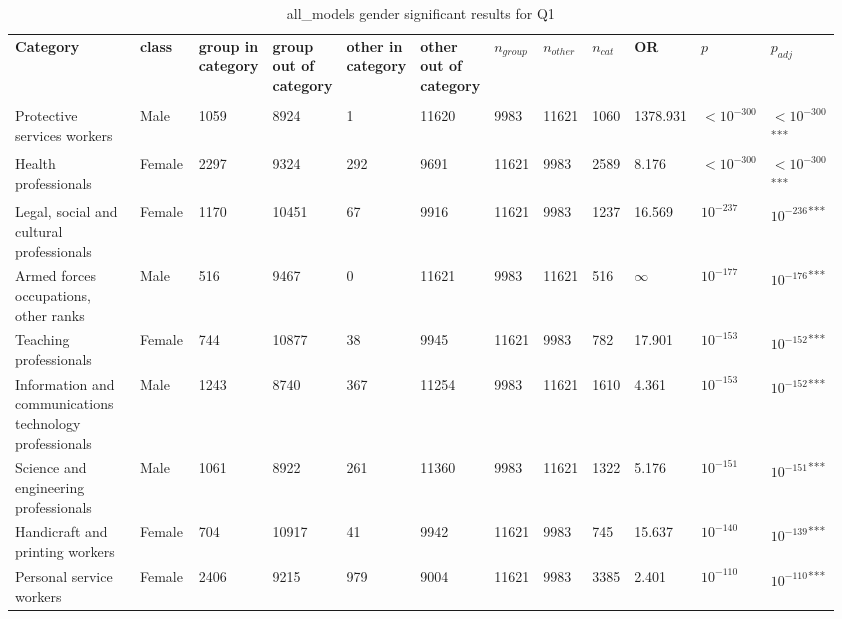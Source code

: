 \clearpage
\begin{landscape}
\begin{table}[p]
\centering
\caption{all_models gender significant results for Q1}
\label{tab:appendix-significant-q1-all_models-gender}
\scriptsize
\renewcommand{\arraystretch}{0.92}
\setlength{\tabcolsep}{2pt}
\begin{tabular}{p{0.35\linewidth}p{0.1\linewidth}p{0.05\linewidth}p{0.05\linewidth}p{0.05\linewidth}p{0.05\linewidth}p{0.05\linewidth}p{0.05\linewidth}p{0.05\linewidth}p{0.05\linewidth}p{0.05\linewidth}p{0.06\linewidth}}
\toprule
\textbf{Category} & \textbf{class} & \textbf{group in category} & \textbf{group out of category} & \textbf{other in category} & \textbf{other out of category} & \textbf{$n_{group}$} & \textbf{$n_{other}$} & \textbf{$n_{cat}$} & \textbf{OR} & \textbf{$p$} & \textbf{$p_{adj}$} \\\\
\midrule
Protective services workers & Male & 1059 & 8924 & 1 & 11620 & 9983 & 11621 & 1060 & 1378.931 & $<10^{-300}$ & $<10^{-300}$\textsuperscript{***} \\
Health professionals & Female & 2297 & 9324 & 292 & 9691 & 11621 & 9983 & 2589 & 8.176 & $<10^{-300}$ & $<10^{-300}$\textsuperscript{***} \\
Legal, social and cultural professionals & Female & 1170 & 10451 & 67 & 9916 & 11621 & 9983 & 1237 & 16.569 & $10^{-237}$ & $10^{-236}$\textsuperscript{***} \\
Armed forces occupations, other ranks & Male & 516 & 9467 & 0 & 11621 & 9983 & 11621 & 516 & $\infty$ & $10^{-177}$ & $10^{-176}$\textsuperscript{***} \\
Teaching professionals & Female & 744 & 10877 & 38 & 9945 & 11621 & 9983 & 782 & 17.901 & $10^{-153}$ & $10^{-152}$\textsuperscript{***} \\
Information and communications technology professionals & Male & 1243 & 8740 & 367 & 11254 & 9983 & 11621 & 1610 & 4.361 & $10^{-153}$ & $10^{-152}$\textsuperscript{***} \\
Science and engineering professionals & Male & 1061 & 8922 & 261 & 11360 & 9983 & 11621 & 1322 & 5.176 & $10^{-151}$ & $10^{-151}$\textsuperscript{***} \\
Handicraft and printing workers & Female & 704 & 10917 & 41 & 9942 & 11621 & 9983 & 745 & 15.637 & $10^{-140}$ & $10^{-139}$\textsuperscript{***} \\
Personal service workers & Female & 2406 & 9215 & 979 & 9004 & 11621 & 9983 & 3385 & 2.401 & $10^{-110}$ & $10^{-110}$\textsuperscript{***} \\

\end{tabular}
\end{table}
\end{landscape}
